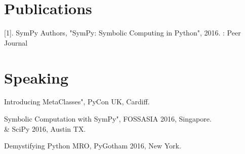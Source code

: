 \documentclass[]{deedy-resume-openfont}
\begin{document}
\begin{minipage}[t]{0.66\textwidth}

\section{Publications} 
\renewcommand\refname{\vskip -1.5cm} %


\nocite{*}
[1]. SymPy Authors, "SymPy: Symbolic Computing in Python", 2016. : Peer Journal


\section{Speaking}
\begin{tightemize}
\item Introducing MetaClasses", PyCon UK, Cardiff.
\item Symbolic Computation with SymPy", FOSSASIA 2016, Singapore.\\ \& SciPy 2016, Austin TX.
\item Demystifying Python MRO, PyGotham 2016, New York.
\end{tightemize}




\end{minipage} 
\end{document}
